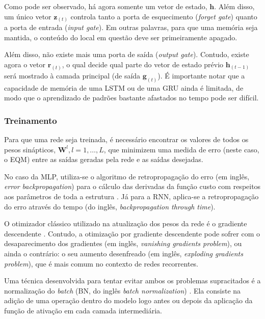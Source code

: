 \documentclass[a4paper]{article}
\begin{document}
\begin{multicols}{2}
Como pode ser observado, há agora somente um vetor de estado, $\mathbf{h}$. Além disso, um único vetor $\mathbf{z}_{(t)}$ controla tanto a porta de esquecimento (\textit{forget gate}) quanto a porta de entrada (\textit{input gate}). Em outras palavras, para que uma memória seja mantida, o conteúdo do local em questão deve ser primeiramente apagado.

Além disso, não existe mais uma porta de saída (\textit{output gate}). Contudo, existe agora o vetor $\mathbf{r}_{(t)}$, o qual decide qual parte do vetor de estado prévio $\mathbf{h}_{(t-1)}$ será mostrado à camada principal (de saída $\mathbf{g}_{(t)}$). É importante notar que a capacidade de memória de uma LSTM ou de uma GRU ainda é limitada, de modo que o aprendizado de padrões bastante afastados no tempo pode ser difícil.

\subsubsection{Treinamento}

Para que uma rede seja treinada, é necessário encontrar os valores de todos os pesos sinápticos, $\mathbf{W}^l, l = 1, \ldots, L$, que minimizem uma medida de erro (neste caso, o EQM) entre as saídas geradas pela rede e as saídas desejadas. 

No caso da MLP, utiliza-se o algoritmo de retropropagação do erro (em inglês, \textit{error backpropagation}) para o cálculo das derivadas da função custo com respeitos aos parâmetros de toda a estrutura \cite{Haykin}. Já para a RNN, aplica-se a retropropagação do erro através do tempo (do inglês, \emph{backpropagation through time}).

O otimizador clássico utilizado na atualização dos pesos da rede é o gradiente descendente \cite{Geron}. Contudo, a otimização por gradiente descendente pode sofrer com o desaparecimento dos gradientes (em inglês, \textit{vanishing gradients problem}), ou ainda o contrário: o seu aumento desenfreado (em inglês, \textit{exploding gradients problem}), que é mais comum no contexto de redes recorrentes.

Uma técnica desenvolvida para tentar evitar ambos os problemas supracitados é a normalização do  \textit{batch} (BN, do inglês \emph{batch normalization}) \cite{Geron}. Ela consiste na adição de uma operação dentro do modelo logo antes ou depois da aplicação da função de ativação em cada camada intermediária.


\end{multicols}
\end{document}
